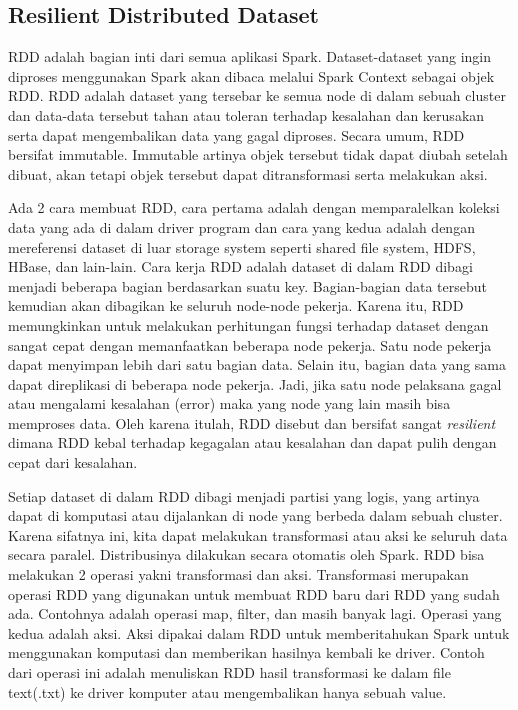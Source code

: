 \subsection{Resilient Distributed Dataset}
RDD adalah bagian inti dari semua aplikasi Spark. Dataset-dataset yang ingin diproses menggunakan Spark akan dibaca melalui Spark Context sebagai objek RDD. RDD adalah dataset yang tersebar ke semua node di dalam sebuah cluster dan data-data tersebut tahan atau toleran terhadap kesalahan dan kerusakan serta dapat mengembalikan data yang gagal diproses. Secara umum, RDD bersifat immutable. Immutable artinya objek tersebut tidak dapat diubah setelah dibuat, akan tetapi objek tersebut dapat ditransformasi serta melakukan aksi. 

Ada 2 cara membuat RDD, cara pertama adalah dengan memparalelkan koleksi data yang ada di dalam driver program dan cara yang kedua adalah dengan mereferensi dataset di luar storage system seperti shared file system, HDFS, HBase, dan lain-lain. Cara kerja RDD adalah dataset di dalam RDD dibagi menjadi beberapa bagian berdasarkan suatu key. Bagian-bagian data tersebut kemudian akan dibagikan ke seluruh node-node pekerja. Karena itu, RDD memungkinkan untuk melakukan perhitungan fungsi terhadap dataset dengan sangat cepat dengan memanfaatkan beberapa node pekerja. Satu node pekerja dapat menyimpan lebih dari satu bagian data. Selain itu, bagian data yang sama dapat direplikasi di beberapa node pekerja. Jadi, jika satu node pelaksana gagal atau mengalami kesalahan (error) maka yang node yang lain masih bisa memproses data. Oleh karena itulah, RDD disebut dan bersifat sangat \textit{resilient} dimana RDD kebal terhadap kegagalan atau kesalahan dan dapat pulih dengan cepat dari kesalahan. 

Setiap dataset di dalam RDD dibagi menjadi partisi yang logis, yang artinya dapat di komputasi atau dijalankan di node yang berbeda dalam sebuah cluster. Karena sifatnya ini, kita dapat melakukan transformasi atau aksi ke seluruh data secara paralel. Distribusinya dilakukan secara otomatis oleh Spark. 
RDD bisa melakukan 2 operasi yakni transformasi dan aksi. Transformasi merupakan operasi RDD yang digunakan untuk membuat RDD baru dari RDD yang sudah ada. Contohnya adalah operasi map, filter, dan masih banyak lagi. Operasi yang kedua adalah aksi. Aksi dipakai dalam RDD untuk memberitahukan Spark untuk menggunakan komputasi dan memberikan hasilnya kembali ke driver. Contoh dari operasi ini adalah menuliskan RDD hasil transformasi ke dalam file text(.txt) ke driver komputer atau mengembalikan hanya sebuah value.

